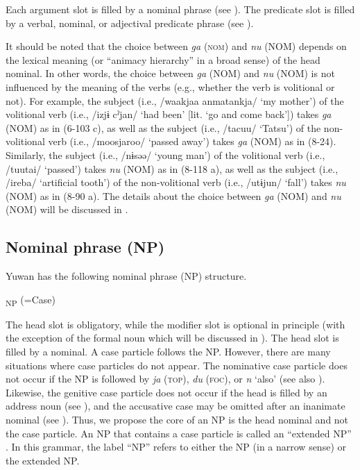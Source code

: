 Each argument slot is filled by a nominal phrase (see ). The predicate slot is filled by a verbal, nominal, or adjectival predicate phrase (see ).

It should be noted that the choice between \textit{ga} (\textsc{nom}) and \textit{nu} (NOM) depends on the lexical meaning (or “animacy hierarchy” in a broad sense) of the head nominal. In other words, the choice between \textit{ga} (NOM) and \textit{nu} (NOM) is not influenced by the meaning of the verbs (e.g., whether the verb is volitional or not). For example, the subject (i.e., /waakjaa anmatankja/ ‘my mother’) of the volitional verb (i.e., /izjɨ cˀjan/ ‘had been’ [lit. ‘go and come back’]) takes \textit{ga} (NOM) as in (6-103 c), as well as the subject (i.e., /tacuu/ ‘Tatsu’) of the non-volitional verb (i.e., /moosjaroo/ ‘passed away’) takes \textit{ga} (NOM) as in (8-24). Similarly, the subject (i.e., /nɨsəə/ ‘young man’) of the volitional verb (i.e., /tuutai/ ‘passed’) takes \textit{nu} (NOM) as in (8-118 a), as well as the subject (i.e., /ireba/ ‘artificial tooth’) of the non-volitional verb (i.e., /utɨjun/ ‘fall’) takes \textit{nu} (NOM) as in (8-90 a). The details about the choice between \textit{ga} (NOM) and \textit{nu} (NOM) will be discussed in .

\subsection{Nominal phrase (NP)}\label{sec:4.1.2}

Yuwan has the following nominal phrase (NP) structure.

\ea{}\textsubscript{NP}\textit{\textsubscript{} }(=Case)
\z

The head slot is obligatory, while the modifier slot is optional in principle (with the exception of the formal noun which will be discussed in ). The head slot is filled by a nominal. A case particle follows the NP. However, there are many situations where case particles do not appear. The nominative case particle does not occur if the NP is followed by \textit{ja} (\textsc{top}), \textit{du} (\textsc{foc}), or \textit{n} ‘also’ (see also ). Likewise, the genitive case particle does not occur if the head is filled by an address noun (see ), and the accusative case may be omitted after an inanimate nominal (see ). Thus, we propose the core of an NP is the head nominal and not the case particle. An NP that contains a case particle is called an “extended NP” \citep[167]{Shimoji2008}. In this grammar, the label “NP” refers to either the NP (in a narrow sense) or the extended NP.

